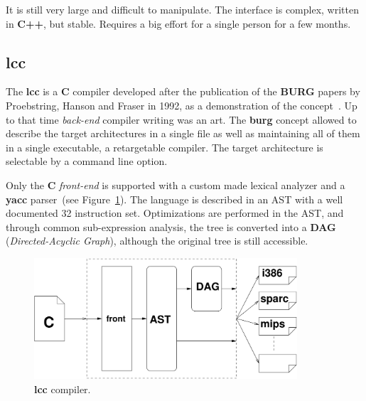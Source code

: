 It is still very large and difficult to manipulate.  The interface is complex,
written in {\bf C++}, but stable.  Requires a big effort for a single person for
a few months.

%

\subsection{lcc}\label{lcc}

The {\bf lcc} is a {\bf C} compiler developed after the publication of the
{\bf BURG} papers by Proebstring, Hanson and Fraser in 1992, as a
demonstration of the concept~\cite{Fraser:burg,Fraser:gen92,Proebsting:2002}.
Up to that time {\it back-end}
compiler writing was an art.  The {\bf burg} concept allowed to describe the
target architectures in a single file as well as maintaining all of them in a
single executable, a retargetable compiler.  The target architecture is
selectable by a command line option.

Only the {\bf C} {\it front-end} is supported with a custom made lexical analyzer and
a {\bf yacc} parser~(see Figure~\ref{fig:lcc}).  The language is described in an
{\sc AST} with a well documented 32 instruction set.  Optimizations are
performed in the {\sc AST}, and through common sub-expression analysis, the tree
is converted into a {\bf DAG} ({\em Directed-Acyclic Graph}), although the
original tree is still accessible.

\begin{figure}[!htbp]
    \centerline{\includegraphics[height=45mm]{Figures/lcc.pdf}}
    \vspace{0cm}\caption{{\bf lcc} compiler.}
    \label{fig:lcc}
\end{figure}


